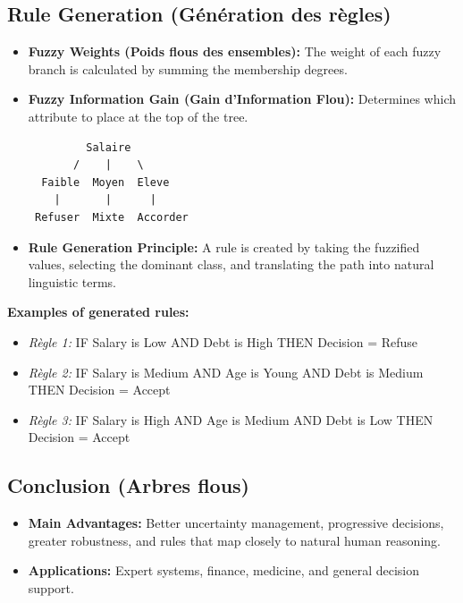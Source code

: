 \documentclass[11pt,a4paper]{article}
\begin{document}
\subsection{Rule Generation (Génération des règles)}
\begin{itemize}
    \item \textbf{Fuzzy Weights (Poids flous des ensembles):} The weight of each fuzzy branch is calculated by summing the membership degrees.
    \item \textbf{Fuzzy Information Gain (Gain d'Information Flou):} Determines which attribute to place at the top of the tree.
\begin{verbatim}
         Salaire
       /    |    \
  Faible  Moyen  Eleve
    |       |      |
 Refuser  Mixte  Accorder
\end{verbatim}
    \item \textbf{Rule Generation Principle:} A rule is created by taking the fuzzified values, selecting the dominant class, and translating the path into natural linguistic terms.
\end{itemize}
\textbf{Examples of generated rules:}
\begin{itemize}
    \item \textit{Règle 1:} IF Salary is Low AND Debt is High THEN Decision = Refuse
    \item \textit{Règle 2:} IF Salary is Medium AND Age is Young AND Debt is Medium THEN Decision = Accept
    \item \textit{Règle 3:} IF Salary is High AND Age is Medium AND Debt is Low THEN Decision = Accept
\end{itemize}

\subsection{Conclusion (Arbres flous)}
\begin{itemize}
    \item \textbf{Main Advantages:} Better uncertainty management, progressive decisions, greater robustness, and rules that map closely to natural human reasoning.
    \item \textbf{Applications:} Expert systems, finance, medicine, and general decision support.
\end{itemize}
\end{document}
